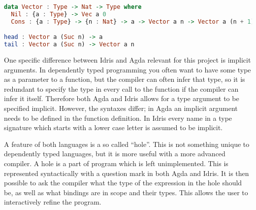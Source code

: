 
\begin{lstlisting}[language=Haskell,label={lst:depex},caption={Definition of
a vector type in Idris, the type signatures of \textit{head} and \textit{tail}. \textit{n} is a type parameter, in this case it is a natural number.  }]
data Vector : Type -> Nat -> Type where
  Nil : {a : Type} -> Vec a 0
  Cons : {a : Type} -> {n : Nat} -> a -> Vector a n -> Vector a (n + 1)

head : Vector a (Suc n) -> a
tail : Vector a (Suc n) -> Vector a n
\end{lstlisting}




%

One specific difference between Idris and Agda relevant for this project is
implicit arguments. In dependently typed programming you often want to have
some type as a parameter to a function, but the compiler can often infer that
type, so it is redundant to specify the type in every call to the function
if the compiler can infer it itself. Therefore both Agda and Idris allows for
a type argument to be specified implicit. However, the syntaxes differ; in Agda
an implicit argument needs to be defined in the function definition. In Idris
every name in a type signature which starts with a lower case letter is assumed
to be implicit.

A feature of both languages is a so called ``hole''. This is not something unique
to dependently typed languages, but it is more useful with a more advanced
compiler. A hole is a part of program which is left unimplemented. This is
represented syntactically with a question mark in both Agda and Idris. It
is then possible to ask the compiler what the type of the expression in the
hole should be, as well as what bindings are in scope and their types. This
allows the user to interactively refine the program.


